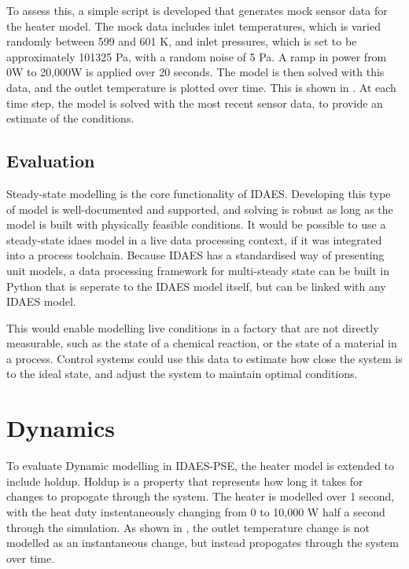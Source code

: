 \documentclass[12pt]{article}
\begin{document}
To assess this, a simple script is developed that generates mock sensor data for the heater model. 
The mock data includes inlet temperatures, which is varied randomly between 599 and 601 K, and inlet pressures, which is set to be approximately 101325 Pa, with a random noise of 5 Pa. 
A ramp in power from 0W to 20,000W is applied over 20 seconds. 
The model is then solved with this data, and the outlet temperature is plotted over time. 
This is shown in . At each time step, the model is solved with the most recent sensor data, to provide an estimate of the conditions.


\subsection{Evaluation}


Steady-state modelling is the core functionality of IDAES. Developing this type of model is well-documented and supported, and solving is robust as long as the model is built with physically feasible conditions.
It would be possible to use a steady-state idaes model in a live data processing context, if it was integrated into a process toolchain. Because IDAES has a standardised way of presenting unit models, a data processing framework for multi-steady state can be built in Python that is seperate to the IDAES model itself, but can be linked with any IDAES model.

This would enable modelling live conditions in a factory that are not directly measurable, such as the state of a chemical reaction, or the state of a material in a process. Control systems could use this data to estimate how close the system is to the ideal state, and adjust the system to maintain optimal conditions.



\section{Dynamics}

To evaluate Dynamic modelling in IDAES-PSE, the heater model is extended to include holdup. Holdup is a property that represents how long it takes for changes to propogate through the system. The heater is modelled over 1 second, with the heat duty instentaneously changing from 0 to 10,000 W half a second through the simulation. As shown in , the outlet temperature change is not modelled as an instantaneous change, but instead propogates through the system over time.
\end{document}
